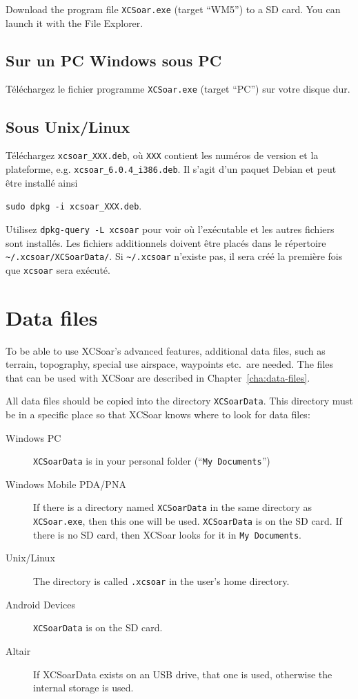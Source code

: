 Download the program file \verb|XCSoar.exe| (target ``WM5'') to a SD
card.  You can launch it with the File Explorer.

\subsection*{Sur un PC Windows sous PC}

Téléchargez le fichier programme \verb|XCSoar.exe| (target ``PC'') sur votre disque dur.

\subsection*{Sous Unix/Linux}

Téléchargez \verb|xcsoar_XXX.deb|, où \verb|XXX| contient les numéros de version et la plateforme, e.g. \verb|xcsoar_6.0.4_i386.deb|.
Il s'agit d'un paquet Debian et peut être installé ainsi 
\begin{center}
\verb|sudo dpkg -i xcsoar_XXX.deb|.
\end{center}
Utilisez \verb|dpkg-query -L xcsoar| pour voir où l'exécutable et les autres fichiers sont installés.
Les fichiers additionnels doivent être placés dans le répertoire
\verb|~/.xcsoar/XCSoarData/|.
Si \verb|~/.xcsoar| n'existe pas, il sera créé la première fois que  \verb|xcsoar| sera exécuté.


\section{Data files}

To be able to use XCSoar's advanced features, additional data files, such as
terrain, topography, special use airspace, waypoints etc.\ are needed. The files
that can be used with XCSoar are described in Chapter~\ref{cha:data-files}.

All data files should be copied into the directory
\texttt{XCSoarData}.  This directory must be in a specific place
so that XCSoar knows where to look for data files:

\begin{description}
\item[Windows PC]
\texttt{XCSoarData} is in your personal folder (``\texttt{My
Documents}'')
\item[Windows Mobile PDA/PNA]
If there is a directory named \texttt{XCSoarData} in the same
directory as \texttt{XCSoar.exe}, then this one will be used.
\texttt{XCSoarData} is on the SD card.  If there is no SD card, then
XCSoar looks for it in \texttt{My Documents}.
\item[Unix/Linux]
The directory is called \verb|.xcsoar| in the user's home directory.
\item[Android Devices]
\texttt{XCSoarData} is on the SD card.
\item[Altair]
If XCSoarData exists on an USB drive, that one is used, otherwise the
internal storage is used.
\end{description}



